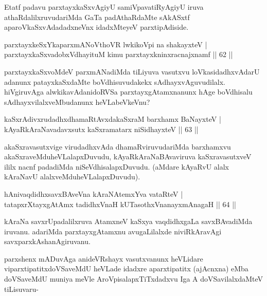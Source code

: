 \begin{artha}
Etatf padavu parxtayxkaSxvAgiyU samiVpavatiRyAgiyU iruva athaRdalilxruvudariMda GaTa padAthaRdaMte sAkASxtf aparoVkaSxvAdadadxneVnx idadxMteyeV parxtipAdiside.
\end{artha}


\begin{shl}
parxtayxkeSxYkaparxmANoV\s thoVR lwkikoV\s pi na shakayxteV |\\
parxtayxkaSxvadobxVdhayituM kimu parxtayxkninxracnajxnamf \hfill || 62 ||
\end{shl}

\begin{artha}
parxtayxkaSxvoMdeV parxmANadiMda tiLiyuva vasutxvu loVkasidadhxvAdarU adanunx patayxkaSxdaMte boVdhisuvudakekx sAdhayxvAguvudilalx. hiVgiruvAga alwkikavAda\break nidoRVSa parxtayxgAtamxnanunx hAge boVdhisalu sAdhayxvilalxveMbudanunx heVLabeVkeVnu? 
\end{artha}


\begin{shl}
kaSxrAdivxrudadhxdhamaRtAvxdakaSxraM barxhamx BaNayxteV |\\
kAyaRkAraNavadavxsutx kaSxramatarx niSidhayxteV \hfill || 63 ||
\end{shl}

\begin{artha}
akaSxravasutxvige virudadhxvAda dhamaRviruvudariMda barxhamxvu akaSxraveMdu\break heVLalapxDuvudu, kAyaRkAraNaBAvaviruva kaSxravasutxveV ililx nacnf padadiMda niSeVdhisalapxDuvudu. (aMdare kAyaRvU alalx kAraNavU alalxveMdu\break heVLalapxDuvudu).
\end{artha}


\begin{shl}
hAnivaqdidhxsavxBAveVna kAraNAtemxYva vataRteV |\\
tatapxrXtayxgAtAmx tadidhxVnaH kUTasothxV\s nanayxmAnagaH \hfill || 64 ||
\end{shl}

\begin{artha}
kAraNa savxrUpadalilxruva AtamxneV kaSxya vaqdidhxgaLa savxBAvadiMda iruvanu. adariMda parxtayxgAtamxnu avugaLilalxde niviRkAravAgi savxparxkAshanAgiruvanu.

parxshenx mADuvAga anideVRshayx vasutxvanunx heVLidare viparxtipatitxdoVSaveMdU heVLade idadxre aparxtipatitx (ajAcnxna) eMba doVSaveMdU muniya meVle AroVpisalapxTiTxdadxvu Iga A doVSavilalxdaMteV tiLisuvaru-
\end{artha}

